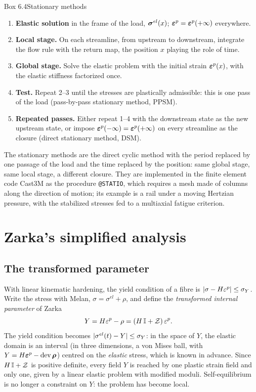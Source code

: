 \begin{gbox}{Box 6.4\quad Stationary methods}
%
\begin{enumerate}[label=\textbf{\arabic*.},leftmargin=1.6em]
  \item \textbf{Elastic solution} in the frame of the load, $\bm{\sigma}^{el}(x)$;
  $\bm{\varepsilon}^{p}=\bm{\varepsilon}^{p}(+\infty)$ everywhere.
  \item \textbf{Local stage.} On each streamline, from upstream to downstream,
  integrate the flow rule with the return map, the position $x$ playing the
  role of time.
  \item \textbf{Global stage.} Solve the elastic problem with the initial strain
  $\bm{\varepsilon}^{p}(x)$, with the elastic stiffness factorized once.
  \item \textbf{Test.} Repeat 2--3 until the stresses are plastically admissible:
  this is one pass of the load (pass-by-pass stationary method, PPSM).
  \item \textbf{Repeated passes.} Either repeat 1--4 with the downstream state as
  the new upstream state, or impose $\bm{\varepsilon}^{p}(-\infty)=\bm{\varepsilon}^{p}(+\infty)$ on every
  streamline as the closure (direct stationary method, DSM).
\end{enumerate}
\end{gbox}
The stationary methods are the direct cyclic method with the period replaced
by one passage of the load and the time replaced by the position: same
global stage, same local stage, a different closure. They are implemented in
the finite element code Cast3M as the procedure \texttt{@STATIO}, which
requires a mesh made of columns along the direction of motion; its example is
a rail under a moving Hertzian pressure, with the stabilized stresses fed to a
multiaxial fatigue criterion.

\section{Zarka's simplified analysis}\label{sec:cy-zarka}
%
\subsection{The transformed parameter}
With linear kinematic hardening, the yield condition of a fibre is
$|\sigma-H\varepsilon^p|\le\sigma_{Y}$. Write the stress with Melan,
$\sigma=\sigma^{el}+\rho$, and define the \emph{transformed internal parameter}
of Zarka~\cite{ZarkaCasier1981,ZarkaEtAl1990}
\begin{equation}\label{eq:cy-zarka-Y}
  Y=H\varepsilon^p-\rho=(H\,\mathbb I+\mathcal{Z})\,\varepsilon^p .
\end{equation}
The yield condition becomes $|\sigma^{el}(t)-Y|\le\sigma_{Y}$: in the space of $Y$,
the elastic domain is an interval (in three dimensions, a von Mises ball, with
$Y=H\bm{\varepsilon}^{p}-\operatorname{dev}\bm{\rho}$) centred on the \emph{elastic} stress, which is known in
advance. Since $H\,\mathbb I+\mathcal{Z}$ is positive definite, every field $Y$ is
reached by one plastic strain field and only one, given by a linear elastic
problem with modified moduli. Self-equilibrium is no longer a constraint on
$Y$: the problem has become local.

